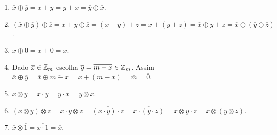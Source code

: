 \documentclass{beamer}
\begin{document}
    \begin{frame}
        \begin{prova}
            \begin{enumerate}[label={\roman*})]
                \item $\overline{x} \oplus \overline{y} = \overline{x + y} = \overline{y + x} = \overline{y} \oplus \overline{x}$.
                
                \item $(\overline{x} \oplus \overline{y}) \oplus \overline{z} = \overline{x + y} \oplus \overline{z} = \overline{(x + y) + z} = \overline{x + (y + z)} = \overline{x} \oplus \overline{y + z} = \overline{x} \oplus (\overline{y} \oplus \overline{z})$.

                \item $\overline{x} \oplus \overline{0} = \overline{x + 0} = \overline{x}$.

                \item Dado $\overline{x} \in \mathbb{Z}_m$ escolha $\overline{y} = \overline{m - x} \in \mathbb{Z}_m$. Assim $\overline{x} \oplus \overline{y} = \overline{x} \oplus \overline{m - x} = \overline{x + (m - x)} = \overline{m} = \overline{0}$.

                \item $\overline{x} \otimes \overline{y} = \overline{x \cdot y} = \overline{y \cdot x} = \overline{y} \otimes \overline{x}$.

                \item $(\overline{x} \otimes \overline{y}) \otimes \overline{z} = \overline{x \cdot y} \otimes \overline{z} = \overline{(x \cdot y)\cdot z} = \overline{x\cdot(y \cdot z)} = \overline{x} \otimes \overline{y \cdot z} = \overline{x} \otimes (\overline{y}\otimes \overline{z})$.

                \item $\overline{x} \otimes \overline{1} = \overline{x \cdot 1} = \overline{x}$.
            \end{enumerate}
        \end{prova}
    \end{frame}
\end{document}
